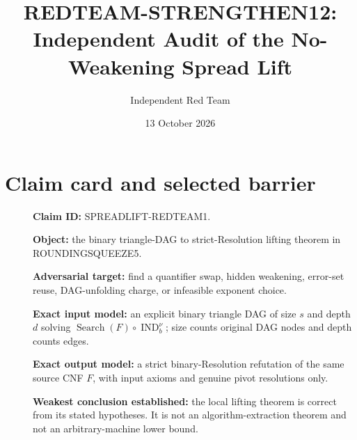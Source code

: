 \documentclass[11pt]{article}
\title{REDTEAM-STRENGTHEN12:\\Independent Audit of the No-Weakening Spread Lift}
\author{Independent Red Team}
\date{13 October 2026}
\newcommand{\IND}{\operatorname{IND}}
\begin{document}
\sloppy
\maketitle

\begin{center}
\end{center}

\section{Claim card and selected barrier}
\begin{description}
\item[] \textbf{Claim ID:} SPREADLIFT-REDTEAM1.
\item[] \textbf{Object:} the binary triangle-DAG to strict-Resolution
lifting theorem in ROUNDINGSQUEEZE5.
\item[] \textbf{Adversarial target:} find a quantifier swap, hidden
weakening, error-set reuse, DAG-unfolding charge, or infeasible exponent
choice.
\item[] \textbf{Exact input model:} an explicit binary triangle DAG of
size $s$ and depth $d$ solving
$\operatorname{Search}(F)\circ\IND_b^\nu$; size counts original DAG nodes
and depth counts edges.
\item[] \textbf{Exact output model:} a strict binary-Resolution refutation
of the same source CNF $F$, with input axioms and genuine pivot resolutions
only.
\item[] \textbf{Weakest conclusion established:} the local lifting theorem
is correct from its stated hypotheses.  It is not an algorithm-extraction
theorem and not an arbitrary-machine lower bound.
\end{description}
\end{document}

